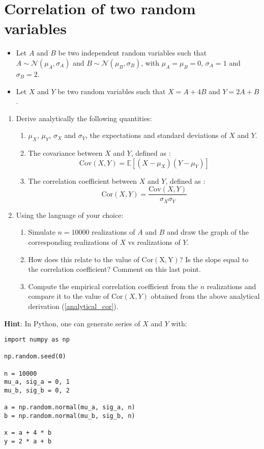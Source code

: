 \section{Correlation of two random variables}

\begin{itemize}
    \item Let $A$ and $B$ be two independent random variables such that $A \sim \mathcal{N}(\mu_A, \sigma_A)$ and $B \sim \mathcal{N}(\mu_B, \sigma_B)$, with $\mu_A = \mu_B = 0$, $\sigma_A = 1$ and $\sigma_B = 2$.
    \item Let $X$ and $Y$ be two random variables such that $X = A + 4B$ and $Y = 2A + B$.
\end{itemize}

\begin{enumerate}
    \item Derive analytically the following quantities:
    \begin{enumerate}
        \item $\mu_X$, $\mu_Y$, $\sigma_X$ and $\sigma_Y$, the expectations and standard deviations of $X$ and $Y$. 
        \item The covariance between $X$ and $Y$, defined as : $$\mathrm{Cov}(X, Y) = \mathbb{E}[(X - \mu_X)(Y - \mu_Y)]$$
        \item\label{analytical_cor} The correlation coefficient between $X$ and $Y$, defined as : $$\mathrm{Cor}(X, Y) = \frac{\mathrm{Cov}(X, Y)}{\sigma_X \sigma_Y}$$
    \end{enumerate}
    \item Using the language of your choice: 
    \begin{enumerate}
        \item Simulate $n = 10000$ realizations of $A$ and $B$ and draw the graph of the corresponding realizations of $X$ vs realizations of $Y$.
        \item How does this relate to the value of $\mathrm{Cor(X, Y)}$? Is the slope equal to the correlation coefficient? Comment on this last point.
        \item Compute the empirical correlation coefficient from the $n$ realizations and compare it to the value of $\mathrm{Cor}(X, Y)$ obtained from the above analytical derivation (\ref{analytical_cor}). 
    \end{enumerate}
\end{enumerate}

\noindent \textbf{Hint}: In Python, one can generate series of $X$ and $Y$ with:

\begin{verbatim}
import numpy as np

np.random.seed(0)

n = 10000
mu_a, sig_a = 0, 1
mu_b, sig_b = 0, 2

a = np.random.normal(mu_a, sig_a, n)
b = np.random.normal(mu_b, sig_b, n)

x = a + 4 * b
y = 2 * a + b
\end{verbatim}

